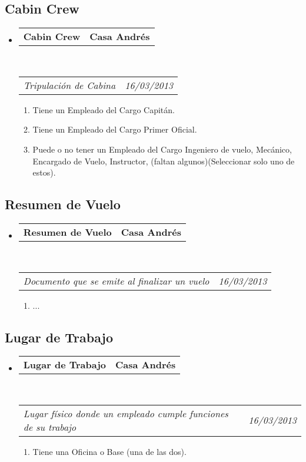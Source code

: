 \documentclass[10pt,letterpaper]{article}
\makeatletter
\newcommand{\headerrow}[2]
{\begin{tabular*}{\linewidth}{l@{\extracolsep{\fill}}r}
	#1 &
	#2 \\
\end{tabular*}}
\makeatother
\begin{document}
\subsection*{Cabin Crew}

\begin{itemize}
	\parskip=0.1em

	\item
	\headerrow
		{\textbf{Cabin Crew}}
		{\textbf{Casa Andrés}}
	\\
	\headerrow
		{\emph{Tripulación de Cabina}}
		{\emph{16/03/2013}}
	\begin{enumerate}
		\item Tiene un Empleado del Cargo Capitán.
		\item Tiene un Empleado del Cargo Primer Oficial.
		\item Puede o no tener un Empleado del Cargo {Ingeniero de vuelo, Mecánico, Encargado de Vuelo, Instructor, (faltan algunos)}(Seleccionar solo uno de estos).
	\end{enumerate}

\end{itemize}

\subsection*{Resumen de Vuelo}

\begin{itemize}
	\parskip=0.1em

	\item
	\headerrow
		{\textbf{Resumen de Vuelo}}
		{\textbf{Casa Andrés}}
	\\
	\headerrow
		{\emph{Documento que se emite al finalizar un vuelo}}
		{\emph{16/03/2013}}
	\begin{enumerate}
		\item ...
	\end{enumerate}

\end{itemize}

\subsection*{Lugar de Trabajo}

\begin{itemize}
	\parskip=0.1em

	\item
	\headerrow
		{\textbf{Lugar de Trabajo}}
		{\textbf{Casa Andrés}}
	\\
	\headerrow
		{\emph{Lugar físico donde un empleado cumple funciones de su trabajo}}
		{\emph{16/03/2013}}
	\begin{enumerate}
		\item Tiene una Oficina o Base (una de las dos).
	\end{enumerate}

\end{itemize}
\end{document}

